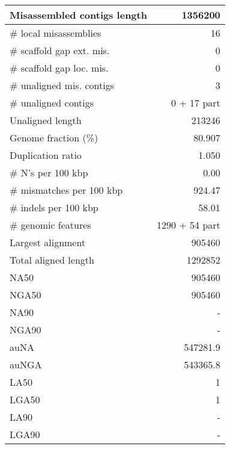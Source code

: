 \documentclass[12pt,a4paper]{article}
\begin{document}
\begin{table}[ht]
\begin{center}
\begin{tabular}{|l*{1}{|r}|}
Misassembled contigs length & 1356200 \\ \hline
\# local misassemblies & 16 \\ \hline
\# scaffold gap ext. mis. & 0 \\ \hline
\# scaffold gap loc. mis. & 0 \\ \hline
\# unaligned mis. contigs & 3 \\ \hline
\# unaligned contigs & 0 + 17 part \\ \hline
Unaligned length & 213246 \\ \hline
Genome fraction (\%) & 80.907 \\ \hline
Duplication ratio & 1.050 \\ \hline
\# N's per 100 kbp & 0.00 \\ \hline
\# mismatches per 100 kbp & 924.47 \\ \hline
\# indels per 100 kbp & 58.01 \\ \hline
\# genomic features & 1290 + 54 part \\ \hline
Largest alignment & 905460 \\ \hline
Total aligned length & 1292852 \\ \hline
NA50 & 905460 \\ \hline
NGA50 & 905460 \\ \hline
NA90 & - \\ \hline
NGA90 & - \\ \hline
auNA & 547281.9 \\ \hline
auNGA & 543365.8 \\ \hline
LA50 & 1 \\ \hline
LGA50 & 1 \\ \hline
LA90 & - \\ \hline
LGA90 & - \\ \hline
\end{tabular}
\end{center}
\end{table}
\end{document}
